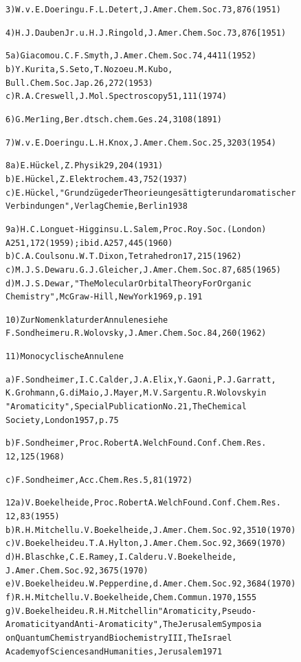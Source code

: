 \documentclass[a4paper,11pt]{article}
\begin{document}
\begin{alltt}
3)   W.v.E.Doering u. F.L.Detert, J.Amer.Chem.Soc. 73, 876 (1951)

4)   H.J.Dauben Jr. u. H.J.Ringold, J.Amer.Chem.Soc. 73, 876 [1951)

5 a) Giacomo u. C.F.Smyth, J.Amer.Chem.Soc. 74, 4411 (1952)
  b) Y.Kurita, S.Seto, T.Nozoe u. M.Kubo,
     Bull.Chem.Soc.Jap. 26, 272 (1953)
  c) R.A.Creswell, J.Mol.Spectroscopy 51, 111 (1974)

6)   G.Mer1ing, Ber.dtsch.chem.Ges. 24, 3108 (1891)

7)   W.v.E.Doering u. L.H.Knox, J.Amer.Chem.Soc. 25, 3203 (1954)

8 a) E.Hückel, Z.Physik 29, 204 (1931)
  b) E.Hückel, Z.Elektrochem. 43, 752 (1937)
  c) E.Hückel,"Grundzüge der Theorie ungesättigter und aromatischer
     Verbindungen", Verlag Chemie, Berlin 1938

9 a) H.C.Longuet-Higgins u. L.Salem, Proc.Roy.Soc. (London)
     A251, 172 (1959); ibid. A257, 445 (1960)
  b) C.A.Coulson u. W.T.Dixon, Tetrahedron 17, 215 (1962)
  c) M.J.S.Dewar u. G.J.Gleicher, J.Amer.Chem.Soc. 87, 685 (1965)
  d) M.J.S.Dewar,"The Molecular Orbital Theory For Organic
     Chemistry", McGraw-Hill, New York 1969, p. 191

10)  Zur Nomenklatur der Annulene siehe
     F.Sondheimer u. R.Wolovsky, J.Amer.Chem.Soc. 84, 260 (1962)

11)  Monocyclische Annulene

  a) F.Sondheimer, I.C.Calder, J.A.Elix, Y.Gaoni, P.J.Garratt,
     K.Grohmann, G.diMaio, J.Mayer, M.V.Sargent u. R.Wolovsky in
     "Aromaticity", Special Publication No. 21, The Chemical
     Society, London 1957, p. 75

  b) F.Sondheimer, Proc.Robert A.Welch Found.Conf.Chem.Res.
     12, 125 (1968)

  c) F.Sondheimer, Acc.Chem.Res. 5, 81 (1972)
\newpage
{}


12 a) V.Boekelheide, Proc.Robert A.Welch Found.Conf.Chem.Res.
      12, 83 (1955)
   b) R.H.Mitchell u. V.Boekelheide, J.Amer.Chem.Soc. 92, 3510 (1970)
   c) V.Boekelheide u. T.A.Hylton, J.Amer.Chem.Soc. 92, 3669 (1970)
   d) H.Blaschke, C.E.Ramey, I.Calder u. V.Boekelheide,
      J.Amer.Chem.Soc. 92, 3675 (1970)
   e) V.Boekelheide u. W.Pepperdine, d.Amer.Chem.Soc. 92, 3684 (1970)
   f) R.H.Mitchell u. V.Boekelheide, Chem.Commun. 1970, 1555
   g) V.Boekelheide u. R.H.Mitchell in "Aromaticity, Pseudo-
      Aromaticity and Anti-Aromaticity", The Jerusalem Symposia
      on Quantum Chemistry and Biochemistry III, The Israel
      Academy of Sciences and Humanities, Jerusalem 1971


\end{alltt}
\end{document}
